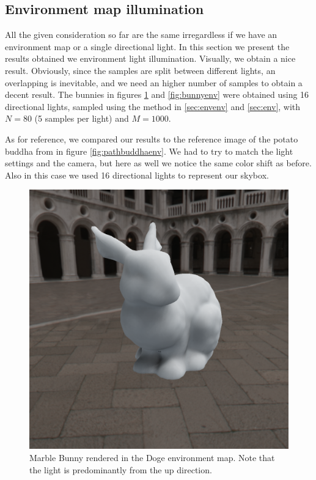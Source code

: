 \subsection{Environment map illumination}

All the given consideration so far are the same irregardless if we have an environment map or a single directional light. In this section we present the results obtained we environment light illumination. Visually, we obtain a nice result. Obviously, since the samples are split between different lights, an overlapping is inevitable, and we need an higher number of samples to obtain a decent result. The bunnies in figures \ref{fig:bunnyenv1} and \ref{fig:bunnyenv} were obtained using 16 directional lights, sampled using the method in \ref{sec:envenv} and \ref{sec:env}, with $N = 80$ (5 samples per light) and $M = 1000$. 

As for reference, we compared our results to the reference image of the potato buddha from \cite{IMM2013-06646} in figure \ref{fig:pathbuddhaenv}. We had to try to match the light settings and the camera, but here as well we notice the same color shift as before. Also in this case we used 16 directional lights to represent our skybox.

\begin{figure}[!h]
\centering
\includegraphics[width=0.7 \linewidth]{images/results/bunny_env_80_1000_nobias.png}
\caption{Marble Bunny rendered in the Doge environment map. Note that the light is predominantly from the up direction.}
\label{fig:bunnyenv1}
\end{figure}



